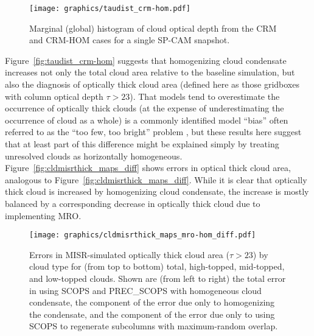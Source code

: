 \begin{figure}[tp]
\centering
\texttt{[image: graphics/taudist\_crm-hom.pdf]}
\caption{\label{fig:taudist_crm-hom}Marginal (global) histogram of cloud
optical depth from the CRM and CRM-HOM cases for a single SP-CAM
snapshot.}\label{fig:taudistux5fcrm-hom}
\end{figure}

Figure~\ref{fig:taudist_crm-hom} suggests that homogenizing cloud
condensate increases not only the total cloud area relative to the
baseline simulation, but also the diagnosis of optically thick cloud
area (defined here as those gridboxes with column optical depth
\(\tau > 23\)). That models tend to overestimate the occurrence of
optically thick clouds (at the expense of underestimating the occurrence
of cloud as a whole) is a commonly identified model ``bias'' often
referred to as the ``too few, too bright'' problem
\citep{zhang_et_al_2005, nam_et_al_2012, kay_et_al_2012, klein_et_al_2013},
but these results here suggest that at least part of this difference
might be explained simply by treating unresolved clouds as horizontally
homogeneous. Figure~\ref{fig:cldmisrthick_maps_diff} shows errors in
optical thick cloud area, analogous to
Figure~\ref{fig:cldmisrthick_maps_diff}. While it is clear that
optically thick cloud is increased by homogenizing cloud condensate, the
increase is mostly balanced by a corresponding decrease in optically
thick cloud due to implementing MRO.

\begin{figure}[tp]
\centering
\texttt{[image: graphics/cldmisrthick\_maps\_mro-hom\_diff.pdf]}
\caption{\label{fig:cldmisrthick_maps_diff}Errors in MISR-simulated
optically thick cloud area (\(\tau > 23\)) by cloud type for (from top
to bottom) total, high-topped, mid-topped, and low-topped clouds. Shown
are (from left to right) the total error in using SCOPS and PREC\_SCOPS
with homogeneous cloud condensate, the component of the error due only
to homogenizing the condensate, and the component of the error due only
to using SCOPS to regenerate subcolumns with maximum-random
overlap.}\label{fig:cldmisrthickux5fmapsux5fdiff}
\end{figure}

